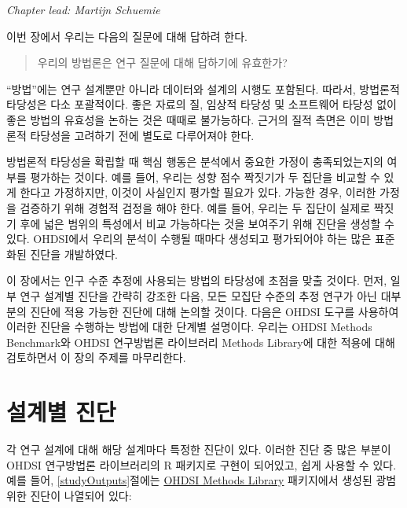\documentclass[10.5pt]{book}
\theoremstyle{definition}
\theoremstyle{definition}
\theoremstyle{definition}
\theoremstyle{remark}
\begin{document}

\emph{Chapter lead: Martijn Schuemie}

이번 장에서 우리는 다음의 질문에 대해 답하려 한다.

\begin{quote}
우리의 방법론은 연구 질문에 대해 답하기에 유효한가?
\end{quote}

``방법''에는 연구 설계뿐만 아니라 데이터와 설계의 시행도 포함된다.
따라서, 방법론적 타당성은 다소 포괄적이다. 좋은 자료의 질, 임상적 타당성
및 소프트웨어 타당성 없이 좋은 방법의 유효성을 논하는 것은 때때로
불가능하다. 근거의 질적 측면은 이미 방법론적 타당성을 고려하기 전에
별도로 다루어져야 한다.

방법론적 타당성을 확립할 때 핵심 행동은 분석에서 중요한 가정이
충족되었는지의 여부를 평가하는 것이다. 예를 들어, 우리는 성향 점수
짝짓기가 두 집단을 비교할 수 있게 한다고 가정하지만, 이것이 사실인지
평가할 필요가 있다. 가능한 경우, 이러한 가정을 검증하기 위해 경험적
검정을 해야 한다. 예를 들어, 우리는 두 집단이 실제로 짝짓기 후에 넓은
범위의 특성에서 비교 가능하다는 것을 보여주기 위해 진단을 생성할 수
있다. OHDSI에서 우리의 분석이 수행될 때마다 생성되고 평가되어야 하는
많은 표준화된 진단을 개발하였다.

이 장에서는 인구 수준 추정에 사용되는 방법의 타당성에 초점을 맞출
것이다. 먼저, 일부 연구 설계별 진단을 간략히 강조한 다음, 모든 모집단
수준의 추정 연구가 아닌 대부분의 진단에 적용 가능한 진단에 대해 논의할
것이다. 다음은 OHDSI 도구를 사용하여 이러한 진단을 수행하는 방법에 대한
단계별 설명이다. 우리는 OHDSI Methods Benchmark와 OHDSI 연구방법론
라이브러리 Methods Library에 대한 적용에 대해 검토하면서 이 장의 주제를
마무리한다.

\section{설계별 진단}\label{-}


각 연구 설계에 대해 해당 설계마다 특정한 진단이 있다. 이러한 진단 중
많은 부분이 OHDSI 연구방법론 라이브러리의 R 패키지로 구현이 되어있고,
쉽게 사용할 수 있다. 예를 들어, \ref{studyOutputs}절에는
\href{https://ohdsi.github.io/MethodsLibrary/}{OHDSI Methods Library}
패키지에서 생성된 광범위한 진단이 나열되어 있다:
\end{document}
